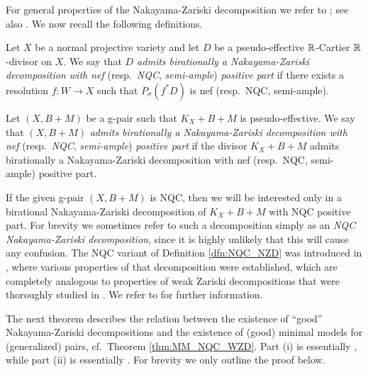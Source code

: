 	For general properties of the Nakayama-Zariski decomposition we refer to \cite[Chapter III]{Nak04}; see also \cite[Lemma 4.1]{BH14b}. We now recall the following definitions.
	
	\begin{dfn} \label{dfn:NQC_NZD}
		Let $ X $ be a normal projective variety and let $ D $ be a pseudo-effective $ \mathbb{R} $-Cartier $ \mathbb{R} $-divisor on $ X $. We say that \emph{$ D $ admits birationally a Nakayama-Zariski decomposition with nef} (resp.\ \emph{NQC}, \emph{semi-ample}) \emph{positive part} if there exists a resolution $ f \colon W \to X $ such that $ P_\sigma ( f^* D ) $ is nef (resp.\ NQC, semi-ample).
		
		Let $ (X,B+M) $ be a g-pair such that $ K_X+B+M $ is pseudo-effective. We say that $ (X,B+M) $ \emph{admits birationally a Nakayama-Zariski decomposition with nef} (resp.\ \emph{NQC}, \emph{semi-ample}) \emph{positive part} if the divisor $ K_X + B + M $ admits birationally a Nakayama-Zariski decomposition with nef (resp.\ NQC, semi-ample) positive part.
	\end{dfn}
	
	If the given g-pair $ (X,B+M) $ is NQC, 
	then we will be interested only in a birational Nakayama-Zariski decomposition of $ K_X+B+M $ with NQC positive part. For brevity we sometimes refer to such a decomposition simply as an \emph{NQC Nakayama-Zariski decomposition}, since it is highly unlikely that this will cause any confusion. The NQC variant of Definition \ref{dfn:NQC_NZD} was introduced in \cite{Tsak21}, where various properties of that decomposition were established, which are completely analogous to properties of weak Zariski decompositions that were thoroughly studied in \cite[Subsection 2.3]{LT22a}. We refer to \cite[Chapter 3]{Tsak21} for further information.
	
	\medskip
	
	The next theorem describes the relation between the existence of \enquote{good} Nakayama-Zariski decompositions and the existence of (good) minimal models for (generalized) pairs, cf.\ Theorem \ref{thm:MM_NQC_WZD}. Part (i) is essentially \cite[Theorem 1.1]{BH14b}, while part (ii) is essentially \cite[Theorem 4.18]{Tsak21}. For brevity we only outline the proof below.
	
